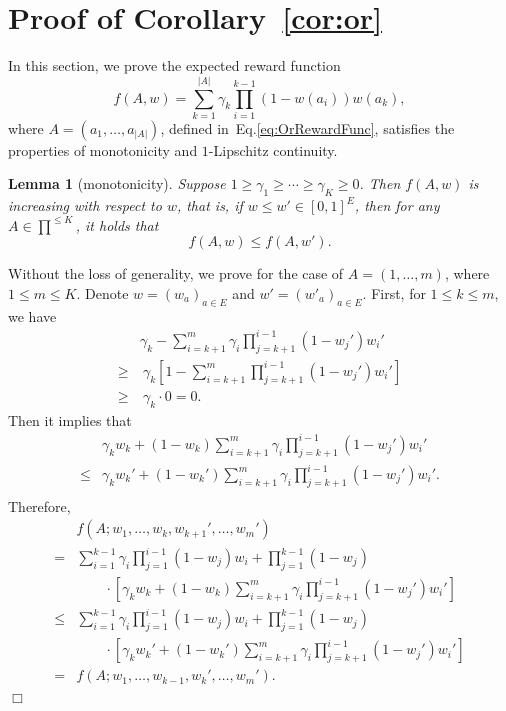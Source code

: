 \documentclass{article}
\newcommand{\abs}[1]{\left| #1 \right|}
\newtheorem{lemma}[theorem]{Lemma}%
\newenvironment{proof}{\noindent {\textbf{Proof. }}}{$\Box$ \medskip}
\begin{document}
\section{Proof of Corollary~\ref{cor:or}}

In this section, we prove the expected reward function
$$
f(A,w) = \sum_{k = 1}^{\abs{A}} \gamma_{k} \prod_{i=1}^{k-1} (1 - w(a_i)) w(a_k),
$$
where $A = (a_1, \ldots, a_{|A|})$, defined in~Eq.\eqref{eq:OrRewardFunc}, satisfies the properties of monotonicity and $1$-Lipschitz continuity.

\begin{lemma}[monotonicity]
	\label{lem:orMonotonicity}
	Suppose $1 \geq \gamma_1 \geq \cdots \geq \gamma_K \geq 0$. Then $f(A, w)$ is increasing with respect to $w$, that is, if $w \leq w' \in [0,1]^E$, then for any $A \in \prod^{\leq K}$, it holds that
	$$
	f(A, w) \leq f(A, w').
	$$
\end{lemma}
\begin{proof}
	Without the loss of generality, we prove for the case of $A = (1, \ldots, m)$, where $1 \leq m \leq K$. Denote $w = (w_a)_{a \in E}$ and $w' = (w'_a)_{a \in E}$. First, for $1 \leq k \leq m$, we have
	\begin{align*}
		&\gamma_{k} - \sum_{i=k+1}^m \gamma_i \prod_{j = k + 1}^{i - 1} (1 - w_j') w_i'\\
		\geq &~\gamma_k [1 - \sum_{i=k+1}^m \prod_{j=k+1}^{i-1}(1 - w_j') w_i']\\
		\geq &~\gamma_{k} \cdot 0 = 0.
	\end{align*}
	Then it implies that
	\begin{align*}
		&\gamma_k w_k + (1 - w_k)\sum_{i=k+1}^m \gamma_i \prod_{j=k+1}^{i-1}(1 - w_j') w_i'\\
		\leq &\gamma_k w_k' + (1 - w_k')\sum_{i=k+1}^m \gamma_i \prod_{j=k+1}^{i-1}(1 - w_j') w_i'.\\
	\end{align*}
	Therefore, 
	\begin{align*}
		& f(A; w_1, \dots, w_k, w_{k+1}', \dots, w_m')\\
		=&\sum_{i=1}^{k-1} \gamma_i \prod_{j=1}^{i-1}(1 - w_j) w_i + \prod_{j=1}^{k-1}(1 - w_j) \\
		&\qquad \cdot [\gamma_k w_k + (1 - w_k)\sum_{i=k+1}^m \gamma_i \prod_{j=k+1}^{i-1}(1 - w_j') w_i']\\
		\leq& \sum_{i=1}^{k-1} \gamma_i \prod_{j=1}^{i-1}(1 - w_j) w_i + \prod_{j=1}^{k-1}(1 - w_j) \\
		&\qquad \cdot [\gamma_k w_k' + (1 - w_k')\sum_{i=k+1}^m \gamma_i \prod_{j=k+1}^{i-1}(1 - w_j') w_i']\\
		=&f(A; w_1, \ldots, w_{k-1}, w_{k}', \ldots, w_m').
	\end{align*}
\end{proof}
\end{document}
